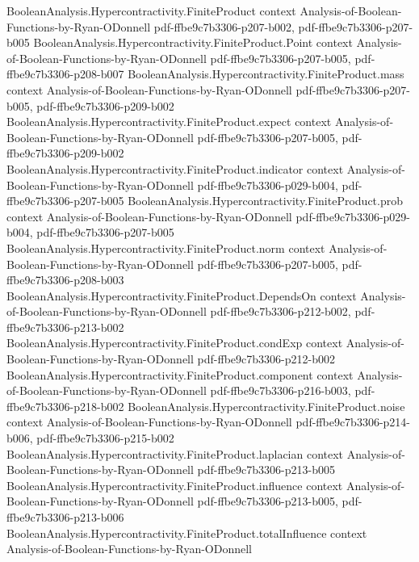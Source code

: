 \begin{theorem}
\proofstep
  {BooleanAnalysis.Hypercontractivity.FiniteProduct}
  {context}
  {Analysis-of-Boolean-Functions-by-Ryan-ODonnell}
  {pdf-ffbe9c7b3306-p207-b002,
    pdf-ffbe9c7b3306-p207-b005}
\proofstep
  {BooleanAnalysis.Hypercontractivity.FiniteProduct.Point}
  {context}
  {Analysis-of-Boolean-Functions-by-Ryan-ODonnell}
  {pdf-ffbe9c7b3306-p207-b005,
    pdf-ffbe9c7b3306-p208-b007}
\proofstep
  {BooleanAnalysis.Hypercontractivity.FiniteProduct.mass}
  {context}
  {Analysis-of-Boolean-Functions-by-Ryan-ODonnell}
  {pdf-ffbe9c7b3306-p207-b005,
    pdf-ffbe9c7b3306-p209-b002}
\proofstep
  {BooleanAnalysis.Hypercontractivity.FiniteProduct.expect}
  {context}
  {Analysis-of-Boolean-Functions-by-Ryan-ODonnell}
  {pdf-ffbe9c7b3306-p207-b005,
    pdf-ffbe9c7b3306-p209-b002}
\proofstep
  {BooleanAnalysis.Hypercontractivity.FiniteProduct.indicator}
  {context}
  {Analysis-of-Boolean-Functions-by-Ryan-ODonnell}
  {pdf-ffbe9c7b3306-p029-b004,
    pdf-ffbe9c7b3306-p207-b005}
\proofstep
  {BooleanAnalysis.Hypercontractivity.FiniteProduct.prob}
  {context}
  {Analysis-of-Boolean-Functions-by-Ryan-ODonnell}
  {pdf-ffbe9c7b3306-p029-b004,
    pdf-ffbe9c7b3306-p207-b005}
\proofstep
  {BooleanAnalysis.Hypercontractivity.FiniteProduct.norm}
  {context}
  {Analysis-of-Boolean-Functions-by-Ryan-ODonnell}
  {pdf-ffbe9c7b3306-p207-b005,
    pdf-ffbe9c7b3306-p208-b003}
\proofstep
  {BooleanAnalysis.Hypercontractivity.FiniteProduct.DependsOn}
  {context}
  {Analysis-of-Boolean-Functions-by-Ryan-ODonnell}
  {pdf-ffbe9c7b3306-p212-b002,
    pdf-ffbe9c7b3306-p213-b002}
\proofstep
  {BooleanAnalysis.Hypercontractivity.FiniteProduct.condExp}
  {context}
  {Analysis-of-Boolean-Functions-by-Ryan-ODonnell}
  {pdf-ffbe9c7b3306-p212-b002}
\proofstep
  {BooleanAnalysis.Hypercontractivity.FiniteProduct.component}
  {context}
  {Analysis-of-Boolean-Functions-by-Ryan-ODonnell}
  {pdf-ffbe9c7b3306-p216-b003,
    pdf-ffbe9c7b3306-p218-b002}
\proofstep
  {BooleanAnalysis.Hypercontractivity.FiniteProduct.noise}
  {context}
  {Analysis-of-Boolean-Functions-by-Ryan-ODonnell}
  {pdf-ffbe9c7b3306-p214-b006,
    pdf-ffbe9c7b3306-p215-b002}
\proofstep
  {BooleanAnalysis.Hypercontractivity.FiniteProduct.laplacian}
  {context}
  {Analysis-of-Boolean-Functions-by-Ryan-ODonnell}
  {pdf-ffbe9c7b3306-p213-b005}
\proofstep
  {BooleanAnalysis.Hypercontractivity.FiniteProduct.influence}
  {context}
  {Analysis-of-Boolean-Functions-by-Ryan-ODonnell}
  {pdf-ffbe9c7b3306-p213-b005,
    pdf-ffbe9c7b3306-p213-b006}
\proofstep
  {BooleanAnalysis.Hypercontractivity.FiniteProduct.totalInfluence}
  {context}
  {Analysis-of-Boolean-Functions-by-Ryan-ODonnell}

\end{theorem}
